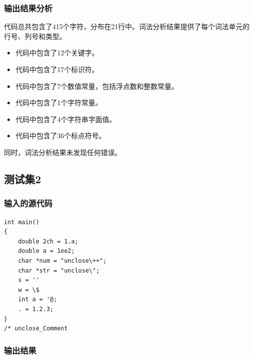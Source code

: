 \documentclass[lang=cn,11pt,a4paper]{elegantpaper}
\begin{document}
\subsubsection{输出结果分析}

代码总共包含了415个字符，分布在21行中。词法分析结果提供了每个词法单元的行号、列号和类型。

\begin{itemize}
    \item 代码中包含了12个关键字。
    \item 代码中包含了17个标识符。
    \item 代码中包含了7个数值常量，包括浮点数和整数常量。
    \item 代码中包含了1个字符常量。
    \item 代码中包含了4个字符串字面值。
    \item 代码中包含了36个标点符号。
\end{itemize}

同时，词法分析结果未发现任何错误。

\subsection{测试集2}

\subsubsection{输入的源代码}

\begin{lstlisting}
int main()
{
    double 2ch = 1.a;
    double a = 1ee2;
    char *num = "unclose\++";
    char *str = "unclose\";
    s = ''
    w = \$
    int a = '@;
    . = 1.2.3;
}
/* unclose_Comment

\end{lstlisting}

\subsubsection{输出结果}

\end{document}
